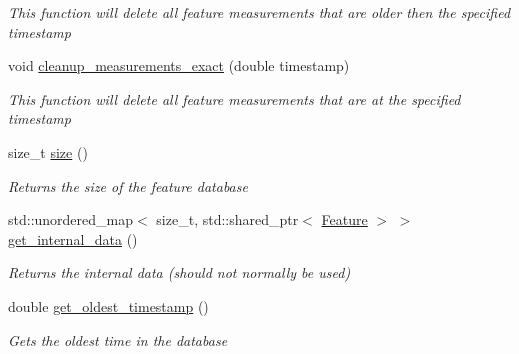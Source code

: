 \begin{DoxyCompactItemize}
\begin{DoxyCompactList}\small\item\em This function will delete all feature measurements that are older then the specified timestamp \end{DoxyCompactList}\item 
\mbox{\label{classov__core_1_1FeatureDatabase_a08484576099480a2fd0b0cc9630c12b6}} 
void \hyperlink{classov__core_1_1FeatureDatabase_a08484576099480a2fd0b0cc9630c12b6}{cleanup\+\_\+measurements\+\_\+exact} (double timestamp)
\begin{DoxyCompactList}\small\item\em This function will delete all feature measurements that are at the specified timestamp \end{DoxyCompactList}\item 
\mbox{\label{classov__core_1_1FeatureDatabase_ab9b243f8a439794e454bfb604061cb4a}} 
size\+\_\+t \hyperlink{classov__core_1_1FeatureDatabase_ab9b243f8a439794e454bfb604061cb4a}{size} ()
\begin{DoxyCompactList}\small\item\em Returns the size of the feature database \end{DoxyCompactList}\item 
\mbox{\label{classov__core_1_1FeatureDatabase_ad105b5cacc83eae1a5fb71f05b084294}} 
std\+::unordered\+\_\+map$<$ size\+\_\+t, std\+::shared\+\_\+ptr$<$ \hyperlink{classov__core_1_1Feature}{Feature} $>$ $>$ \hyperlink{classov__core_1_1FeatureDatabase_ad105b5cacc83eae1a5fb71f05b084294}{get\+\_\+internal\+\_\+data} ()
\begin{DoxyCompactList}\small\item\em Returns the internal data (should not normally be used) \end{DoxyCompactList}\item 
\mbox{\label{classov__core_1_1FeatureDatabase_a890b5a9095ebe2a6adbe208865170274}} 
double \hyperlink{classov__core_1_1FeatureDatabase_a890b5a9095ebe2a6adbe208865170274}{get\+\_\+oldest\+\_\+timestamp} ()
\begin{DoxyCompactList}\small\item\em Gets the oldest time in the database \end{DoxyCompactList}\item 

\end{DoxyCompactItemize}
